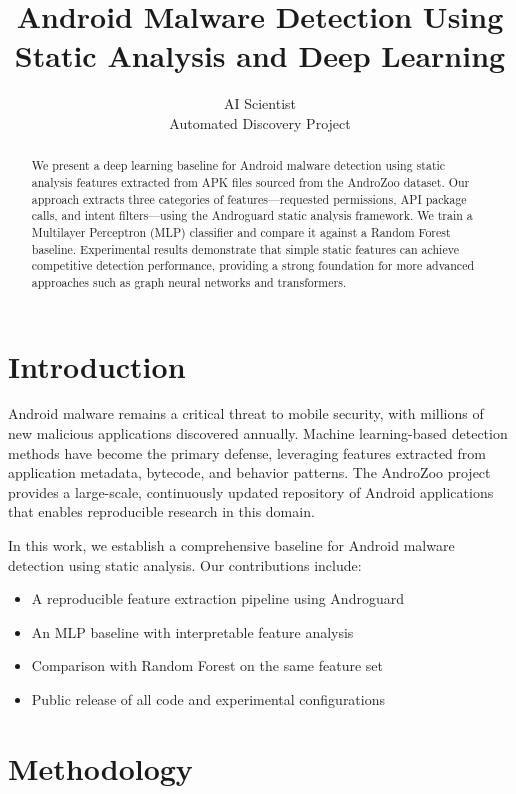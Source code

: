 \documentclass{article}
\title{Android Malware Detection Using Static Analysis and Deep Learning}
\author{
  AI Scientist \\
  Automated Discovery Project
}
\begin{document}
\maketitle

\begin{abstract}
We present a deep learning baseline for Android malware detection using static analysis features extracted from APK files sourced from the AndroZoo dataset. Our approach extracts three categories of features---requested permissions, API package calls, and intent filters---using the Androguard static analysis framework. We train a Multilayer Perceptron (MLP) classifier and compare it against a Random Forest baseline. Experimental results demonstrate that simple static features can achieve competitive detection performance, providing a strong foundation for more advanced approaches such as graph neural networks and transformers.
\end{abstract}

\section{Introduction}
Android malware remains a critical threat to mobile security, with millions of new malicious applications discovered annually. Machine learning-based detection methods have become the primary defense, leveraging features extracted from application metadata, bytecode, and behavior patterns. The AndroZoo project~\cite{androzoo} provides a large-scale, continuously updated repository of Android applications that enables reproducible research in this domain.

In this work, we establish a comprehensive baseline for Android malware detection using static analysis. Our contributions include:
\begin{itemize}
    \item A reproducible feature extraction pipeline using Androguard
    \item An MLP baseline with interpretable feature analysis
    \item Comparison with Random Forest on the same feature set
    \item Public release of all code and experimental configurations
\end{itemize}

\section{Methodology}
\end{document}
